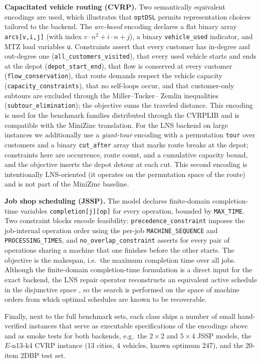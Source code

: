 \documentclass[11pt,a4paper]{article}
\begin{document}
\textbf{Capacitated vehicle routing (CVRP).}
Two semantically equivalent encodings are used, which illustrates that
\texttt{optDSL} permits representation choices tailored to the backend.
The \emph{arc-based} encoding declares a flat binary array
\texttt{arcs[v,i,j]} (with index $v\cdot n^2 + i\cdot n + j$), a binary
\texttt{vehicle\_used} indicator, and MTZ load variables \texttt{u}.
Constraints assert that every customer has in-degree and out-degree one
(\texttt{all\_customers\_visited}), that every used vehicle starts and ends
at the depot (\texttt{depot\_start\_end}), that flow is conserved at every
customer (\texttt{flow\_conservation}), that route demands respect the
vehicle capacity (\texttt{capacity\_constraints}), that no self-loops occur,
and that customer-only subtours are excluded through the Miller--Tucker--
Zemlin inequalities (\texttt{subtour\_elimination}); the objective sums the
traveled distance.
This encoding is used for the benchmark families distributed through the
CVRPLIB \citep{uchoa2017cvrplib} and is compatible with the MiniZinc
translation.
For the LNS backend on large instances we additionally use a
\emph{giant-tour} encoding with a permutation \texttt{tour} over customers
and a binary \texttt{cut\_after} array that marks route breaks at the
depot; constraints here are occurrence, route count, and a cumulative
capacity bound, and the objective inserts the depot detour at each cut.
This second encoding is intentionally LNS-oriented (it operates on the
permutation space of the route) and is not part of the MiniZinc baseline.

\textbf{Job shop scheduling (JSSP).}
The model declares finite-domain completion-time variables
\texttt{completion[j][op]} for every operation, bounded by
\texttt{MAX\_TIME}.
Two constraint blocks encode feasibility:
\texttt{precedence\_constraint} imposes the job-internal operation order
using the per-job \texttt{MACHINE\_SEQUENCE} and \texttt{PROCESSING\_TIMES},
and \texttt{no\_overlap\_constraint} asserts for every pair of operations
sharing a machine that one finishes before the other starts.
The objective is the makespan, i.e.\ the maximum completion time over all
jobs.
Although the finite-domain completion-time formulation is a direct input
for the exact backend, the LNS repair operator reconstructs an equivalent
active schedule in the disjunctive space \citep{applegate1991}, so the
search is performed on the space of machine orders from which optimal
schedules are known to be recoverable.

Finally, next to the full benchmark sets, each class ships a number of
small hand-verified instances that serve as executable specifications of
the encodings above and as smoke tests for both backends, e.g.\ the
$2\times2$ and $5\times4$ JSSP models, the $E$-n13-k4 CVRP instance
(13 cities, 4 vehicles, known optimum 247), and the 20-item 2DBP test set.
\end{document}
